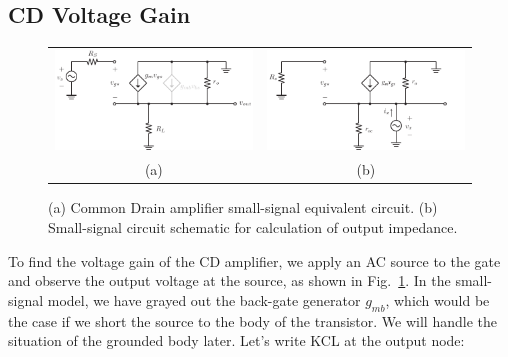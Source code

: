 \subsection{CD Voltage Gain}
\begin{figure}[tb]
\centering
\begin{tabular}{cc}
\includegraphics[scale=.7]{cd_amp_ss_av2} &
\includegraphics[scale=.7]{cd_amp_ss_rout}\\
(a) & (b)\\
\end{tabular}
\caption{(a) Common Drain amplifier small-signal equivalent circuit.  (b)  Small-signal circuit schematic for calculation of output impedance.}
\label{fig:cd_amp_ss_av2}
\end{figure}
To find the voltage gain of the CD amplifier, we apply an AC source to the gate and observe the output voltage at the source, as shown in Fig.~\ref{fig:cd_amp_ss_av2}.  In the small-signal model, we have grayed out the back-gate generator $g_{mb}$, which would be the case if we short the source to the body of the transistor.  We will handle the situation of the grounded body later. Let's write KCL at the output node:

